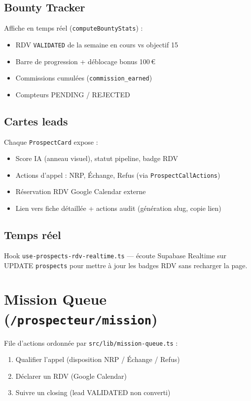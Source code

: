 \documentclass[11pt,a4paper]{report}
\begin{document}
\subsection{Bounty Tracker}
Affiche en temps réel (\texttt{computeBountyStats}) :
\begin{itemize}[noitemsep]
  \item RDV \texttt{VALIDATED} de la semaine en cours vs objectif 15
  \item Barre de progression + déblocage bonus 100\,€
  \item Commissions cumulées (\texttt{commission\_earned})
  \item Compteurs PENDING / REJECTED
\end{itemize}

\subsection{Cartes leads}
Chaque \texttt{ProspectCard} expose :
\begin{itemize}[noitemsep]
  \item Score IA (anneau visuel), statut pipeline, badge RDV
  \item Actions d'appel : NRP, Échange, Refus (via \texttt{ProspectCallActions})
  \item Réservation RDV Google Calendar externe
  \item Lien vers fiche détaillée + actions audit (génération slug, copie lien)
\end{itemize}

\subsection{Temps réel}
Hook \texttt{use-prospects-rdv-realtime.ts} --- écoute Supabase Realtime sur UPDATE \texttt{prospects} pour mettre à jour les badges RDV sans recharger la page.

\section{Mission Queue (\texttt{/prospecteur/mission})}

File d'actions ordonnée par \texttt{src/lib/mission-queue.ts} :
\begin{enumerate}[noitemsep]
  \item Qualifier l'appel (disposition NRP / Échange / Refus)
  \item Déclarer un RDV (Google Calendar)
  \item Suivre un closing (lead VALIDATED non converti)
\end{enumerate}
\end{document}
